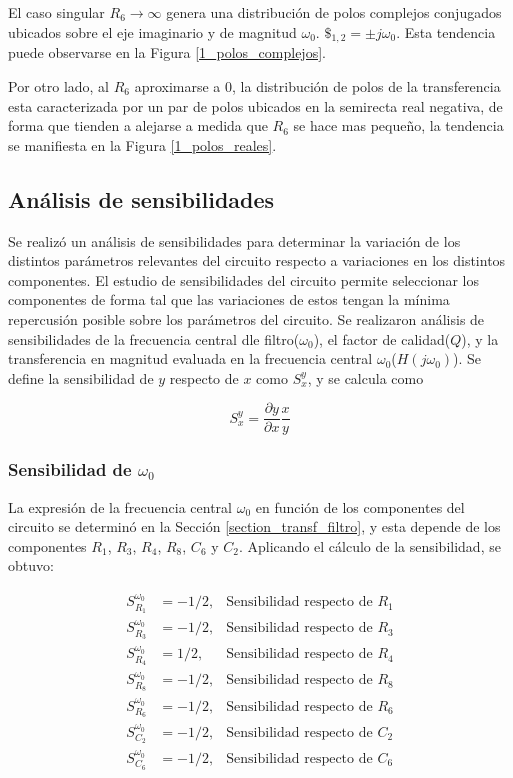 El caso singular $R_6 \rightarrow \infty$ genera una distribución de polos complejos conjugados ubicados sobre el eje imaginario y de magnitud $\omega_0$. $\$_{1,2} = \pm j\omega_0$. Esta tendencia puede observarse en la Figura \ref{1_polos_complejos}. 

Por otro lado, al $R_6$ aproximarse a 0, la distribución de polos de la transferencia esta caracterizada por un par de polos ubicados en la semirecta real negativa, de forma que tienden a alejarse a medida que $R_6$ se hace mas pequeño, la tendencia se manifiesta en la Figura \ref{1_polos_reales}.

\subsection{Análisis de sensibilidades}
Se realizó un análisis de sensibilidades para determinar la variación de los distintos parámetros relevantes del circuito respecto a variaciones en los distintos componentes. El estudio de sensibilidades del circuito permite seleccionar los componentes de forma tal que las variaciones de estos tengan la mínima repercusión posible sobre los parámetros del circuito. Se realizaron análisis de sensibilidades de la frecuencia central dle filtro($\omega_0$), el factor de calidad($Q$), y la transferencia en magnitud evaluada en la frecuencia central $\omega_0$($H(j\omega_0)$). Se define la sensibilidad de $y$ respecto de $x$ como $S_x^y$, y se calcula como

\[
S_x^y = \frac{\partial y}{\partial x} \frac{x}{y}
\]

\subsubsection{Sensibilidad de $\omega_0$}
La expresión de la frecuencia central $\omega_0$ en función de los componentes del circuito se determinó en la Sección \ref{section_transf_filtro}, y esta depende de los componentes $R_1$, $R_3$, $R_4$, $R_8$, $C_6$ y $C_2$. Aplicando el cálculo de la sensibilidad, se obtuvo:

\begin{subequations}
\begin{align*}
  S_{R_1}^{\omega_0} &= -1/2, &\text{Sensibilidad respecto de }R_1 \\
  S_{R_3}^{\omega_0} &= -1/2, &\text{Sensibilidad respecto de }R_3 \\
  S_{R_4}^{\omega_0} &= 1/2, &\text{Sensibilidad respecto de }R_4 \\
  S_{R_8}^{\omega_0} &= -1/2, &\text{Sensibilidad respecto de } R_8 \\
  S_{R_6}^{\omega_0} &= -1/2, &\text{Sensibilidad respecto de } R_6 \\
  S_{C_2}^{\omega_0} &= -1/2, &\text{Sensibilidad respecto de } C_2 \\
  S_{C_6}^{\omega_0} &= -1/2, &\text{Sensibilidad respecto de } C_6
\end{align*}
\end{subequations}

